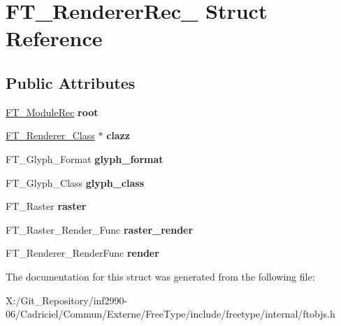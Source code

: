 \hypertarget{struct_f_t___renderer_rec__}{\section{F\-T\-\_\-\-Renderer\-Rec\-\_\- Struct Reference}
\label{struct_f_t___renderer_rec__}
}
\subsection*{Public Attributes}
\begin{DoxyCompactItemize}
\item 
\hypertarget{struct_f_t___renderer_rec___a7c93326898f03a9eb224f57104fa2433}{\hyperlink{struct_f_t___module_rec__}{F\-T\-\_\-\-Module\-Rec} {\bfseries root}}\label{struct_f_t___renderer_rec___a7c93326898f03a9eb224f57104fa2433}

\item 
\hypertarget{struct_f_t___renderer_rec___a2b13c0a776ea7f589f41f576f9c4e8ad}{\hyperlink{struct_f_t___renderer___class__}{F\-T\-\_\-\-Renderer\-\_\-\-Class} $\ast$ {\bfseries clazz}}\label{struct_f_t___renderer_rec___a2b13c0a776ea7f589f41f576f9c4e8ad}

\item 
\hypertarget{struct_f_t___renderer_rec___a478b14f577b633cea7043fb17d404721}{F\-T\-\_\-\-Glyph\-\_\-\-Format {\bfseries glyph\-\_\-format}}\label{struct_f_t___renderer_rec___a478b14f577b633cea7043fb17d404721}

\item 
\hypertarget{struct_f_t___renderer_rec___a38a591be1d20fb2b4d81e48ebb624dd7}{F\-T\-\_\-\-Glyph\-\_\-\-Class {\bfseries glyph\-\_\-class}}\label{struct_f_t___renderer_rec___a38a591be1d20fb2b4d81e48ebb624dd7}

\item 
\hypertarget{struct_f_t___renderer_rec___a9c54a2da84f5892e0563d032ebd1ee09}{F\-T\-\_\-\-Raster {\bfseries raster}}\label{struct_f_t___renderer_rec___a9c54a2da84f5892e0563d032ebd1ee09}

\item 
\hypertarget{struct_f_t___renderer_rec___a6dc07268fc39d9dde130a5708607d19d}{F\-T\-\_\-\-Raster\-\_\-\-Render\-\_\-\-Func {\bfseries raster\-\_\-render}}\label{struct_f_t___renderer_rec___a6dc07268fc39d9dde130a5708607d19d}

\item 
\hypertarget{struct_f_t___renderer_rec___a197bfeb9dde4aef8eee87bc3ea95312e}{F\-T\-\_\-\-Renderer\-\_\-\-Render\-Func {\bfseries render}}\label{struct_f_t___renderer_rec___a197bfeb9dde4aef8eee87bc3ea95312e}

\end{DoxyCompactItemize}


The documentation for this struct was generated from the following file\-:\begin{DoxyCompactItemize}
\item 
X\-:/\-Git\-\_\-\-Repository/inf2990-\/06/\-Cadriciel/\-Commun/\-Externe/\-Free\-Type/include/freetype/internal/ftobjs.\-h\end{DoxyCompactItemize}
